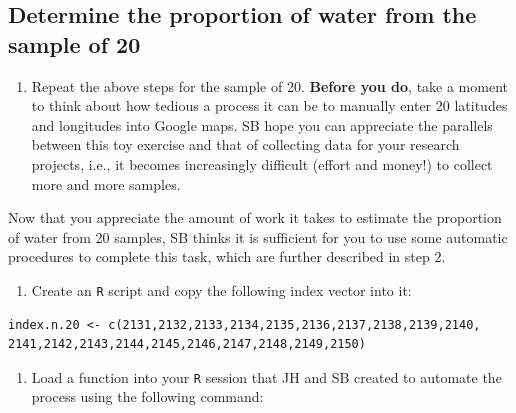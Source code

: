 \documentclass[letterpaper,10pt,twoside,]{pinp}
\providecommand{\tightlist}{%
  \setlength{\itemsep}{0pt}\setlength{\parskip}{0pt}}
\begin{document}
\hypertarget{determine-the-proportion-of-water-from-the-sample-of-20}{%
\subsection{Determine the proportion of water from the sample of
20}\label{determine-the-proportion-of-water-from-the-sample-of-20}}

\begin{enumerate}
\def\labelenumi{\arabic{enumi}.}
\tightlist
\item
  Repeat the above steps for the sample of 20. \textbf{Before you do},
  take a moment to think about how tedious a process it can be to
  manually enter 20 latitudes and longitudes into Google maps. SB hope
  you can appreciate the parallels between this toy exercise and that of
  collecting data for your research projects, i.e., it becomes
  increasingly difficult (effort and money!) to collect more and more
  samples.
\end{enumerate}

Now that you appreciate the amount of work it takes to estimate the
proportion of water from 20 samples, SB thinks it is sufficient for you
to use some automatic procedures to complete this task, which are
further described in step 2.

\begin{enumerate}
\def\labelenumi{\arabic{enumi}.}
\setcounter{enumi}{1}
\tightlist
\item
  Create an \texttt{R} script and copy the following index vector into
  it:
\end{enumerate}

\begin{ShadedResult}
\begin{verbatim}
index.n.20 <- c(2131,2132,2133,2134,2135,2136,2137,2138,2139,2140,
2141,2142,2143,2144,2145,2146,2147,2148,2149,2150)
\end{verbatim}
\end{ShadedResult}

\begin{enumerate}
\def\labelenumi{\arabic{enumi}.}
\setcounter{enumi}{2}
\tightlist
\item
  Load a function into your \texttt{R} session that JH and SB created to
  automate the process using the following command:
\end{enumerate}

\begin{Shaded}
\begin{Highlighting}[]
\NormalTok{(}\NormalTok{)}
\end{Highlighting}
\end{Shaded}
\end{document}

